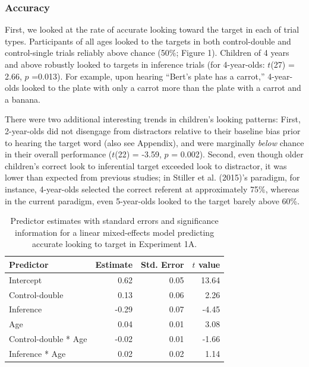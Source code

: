 \documentclass[a4paper,man,apacite,floatsintext]{apa6}
\begin{document}
\subsubsection{Accuracy}\label{accuracy}

First, we looked at the rate of accurate looking toward the target in
each of trial types. Participants of all ages looked to the targets in
both control-double and control-single trials reliably above chance
(50\%; Figure 1). Children of 4 years and above robustly looked to
targets in inference trials (for 4-year-olds: \(t\)(27) = 2.66, \(p\)
=0.013). For example, upon hearing ``Bert's plate has a carrot,''
4-year-olds looked to the plate with only a carrot more than the plate
with a carrot and a banana.

There were two additional interesting trends in children's looking
patterns: First, 2-year-olds did not disengage from distractors relative
to their baseline bias prior to hearing the target word (also see
Appendix), and were marginally \emph{below} chance in their overall
performance (\(t\)(22) = -3.59, \(p\) = 0.002). Second, even though
older children's correct look to inferential target exceeded look to
distractor, it was lower than expected from previous studies; in Stiller
et al. (2015)'s paradigm, for instance, 4-year-olds selected the correct
referent at approximately 75\%, whereas in the current paradigm, even
5-year-olds looked to the target barely above 60\%.

\begin{table}[tb]
\centering
\begin{tabular}{lrrr}
 Predictor & Estimate & Std. Error & $t$ value \\ 
  \hline
Intercept & 0.62 & 0.05 & 13.64 \\ 
  Control-double & 0.13 & 0.06 & 2.26 \\ 
  Inference & -0.29 & 0.07 & -4.45 \\ 
  Age & 0.04 & 0.01 & 3.08 \\ 
  Control-double * Age & -0.02 & 0.01 & -1.66 \\ 
  Inference * Age & 0.02 & 0.02 & 1.14 \\ 
   \hline
\end{tabular}
\caption{Predictor estimates with standard errors and significance information for a linear mixed-effects model predicting accurate looking to target in Experiment 1A.} 
\label{tab:exp1_tab}
\end{table}
\end{document}
